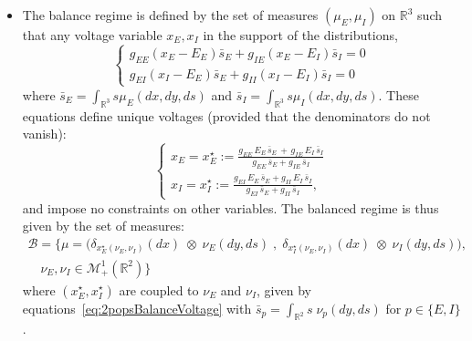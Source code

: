 \documentclass[onefignum,onetabnum]{siamart190516}
\newcommand{\R}{\mathbb{R}}
\newcommand{\1}{\mathbbm{1}}
\newcommand{\B}{\mathcal{B}}
\newcommand{\review}[1]{\textcolor{midblue}{ #1}}
\renewcommand{\review}[1]{{ #1}}
\begin{document}
 \begin{itemize}
 \item The balance regime is defined by the set of measures $(\mu_E,\mu_I)$ on $\R^3$ such that any voltage variable $x_E,x_I$ in the support of the distributions,
	\[\begin{cases}
	g_{E E} (x_E-E_{E})\bar{s}_E + g_{I E} (x_E-E_{I})\bar{s}_I=0\\
	g_{E I} (x_I-E_{E})\bar{s}_E + g_{I I} (x_I-E_{I})\bar{s}_I=0
	\end{cases}\]
	where $\bar{s}_E=\int_{\R^3} s \mu_E(dx,dy,ds)$ and $\bar{s}_I= \int_{\R^3} s\mu_I(dx,dy,ds)$. These equations define unique voltages (provided that the denominators do not vanish):
	\begin{equation}\label{eq:2popsBalanceVoltage}
	\begin{cases}
	\displaystyle x_E= x_E^\star:=\frac{g_{EE}\, E_E \, \bar{s}_E\,+\,g_{IE}\,E_I \, \bar{s}_I}{g_{EE} \, \bar{s}_E+g_{IE}\, \bar{s}_I}\\[10pt]
	\displaystyle x_I= x_I^\star:=\frac{g_{EI} \, E_E \, \bar{s}_E+g_{II} \, E_I \, \bar{s}_I}{g_{EI} \, \bar{s}_E+g_{II} \,\bar{s}_I},
	\end{cases}
	\end{equation}
	\review{and impose no constraints on other variables. The balanced regime is thus given by the set of measures:
	\begin{multline}
	\B=\Big\{\mu=\Big (\delta_{x_E^\star(\nu_E,\nu_I)} (dx)\; \otimes \; \nu_E(dy,ds)\; ,\; \delta_{x_I^\star(\nu_E,\nu_I)}(dx) \; \otimes \; \nu_I(dy,ds)\Big), \\
	\quad \nu_E,\nu_I\in \mathcal{M}^1_+(\R^2)\Big\}
	\end{multline}
	where $(x_E^\star,x_I^\star)$ are coupled to $\nu_E$ and $\nu_I$, given by equations~\eqref{eq:2popsBalanceVoltage} with $\bar{s}_p=\int_{\R^2} s \; \nu_p(dy,ds)$ for $p\in \{E,I\}$. }
	

\end{itemize}
\end{document}
